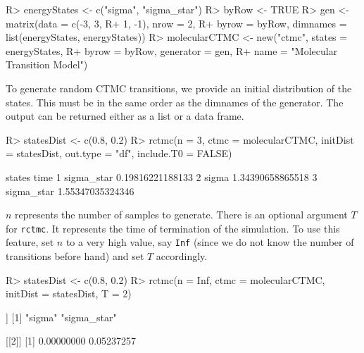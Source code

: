\documentclass[
  nojss]{jss}
\begin{document}
\begin{CodeChunk}

\begin{CodeInput}
R> energyStates <- c("sigma", "sigma_star")
R> byRow <- TRUE
R> gen <- matrix(data = c(-3, 3,
R+                        1, -1), nrow = 2,
R+               byrow = byRow, dimnames = list(energyStates, energyStates))
R> molecularCTMC <- new("ctmc", states = energyStates, 
R+                  byrow = byRow, generator = gen, 
R+                  name = "Molecular Transition Model")      
\end{CodeInput}
\end{CodeChunk}

To generate random CTMC transitions, we provide an initial distribution of the states. This must be in the same order as the dimnames of the generator. The output can be returned either as a list or a data frame.

\begin{CodeChunk}

\begin{CodeInput}
R> statesDist <- c(0.8, 0.2)
R> rctmc(n = 3, ctmc = molecularCTMC, initDist = statesDist, out.type = "df", include.T0 = FALSE)
\end{CodeInput}

\begin{CodeOutput}
      states             time
1 sigma_star 0.19816221188133
2      sigma 1.34390658865518
3 sigma_star 1.55347035324346
\end{CodeOutput}
\end{CodeChunk}

\(n\) represents the number of samples to generate. There is an optional argument \(T\) for \texttt{rctmc}. It represents the time of termination of the simulation. To use this feature, set \(n\) to a very high value, say \texttt{Inf} (since we do not know the number of transitions before hand) and set \(T\) accordingly.

\begin{CodeChunk}

\begin{CodeInput}
R> statesDist <- c(0.8, 0.2)
R> rctmc(n = Inf, ctmc = molecularCTMC, initDist = statesDist, T = 2)
\end{CodeInput}

\begin{CodeOutput}
[[1]]
[1] "sigma"      "sigma_star"

[[2]]
[1] 0.00000000 0.05237257
\end{CodeOutput}
\end{CodeChunk}
\end{document}
